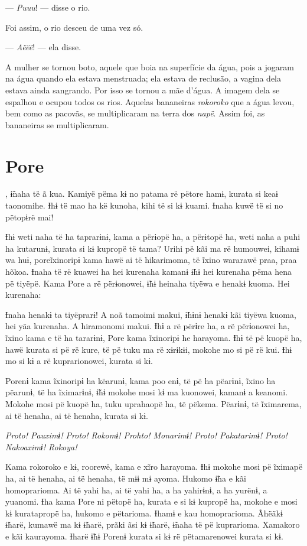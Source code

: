 --- \textit{Puuu}! --- disse o rio. 

Foi assim, o rio desceu de uma vez só. 

--- \textit{Aëëë}! --- ela disse. 

A mulher se tornou boto, aquele que boia na superfície da água, pois a
jogaram na água quando ela estava menstruada; ela estava de reclusão, a
vagina dela estava ainda sangrando. Por isso se tornou a mãe d'água. 
A imagem dela se espalhou e ocupou todos os rios. Aquelas
bananeiras \textit{rokoroko} que a água levou, bem como as pacovãs, se
multiplicaram na terra dos \textit{napë}. Assim foi, as bananeiras se
multiplicaram. 

\chapter{Pore}
 
, ɨ̃naha të ã kua. Kamiyë pëma kɨ no patama rë pëtore hamɨ, kurata si
keaɨ taonomihe. Ɨhɨ të mao ha kë kunoha, kihi të si kɨ kuami. Ɨnaha kuwë
të si no pëtopɨrë mai! 

Ɨhɨ weti naha të ha taprarɨnɨ, kama a përɨopë ha, a përɨtopë ha, weti
naha a puhi ha kutarunɨ, kurata si kɨ kupropë të tama? Urihi pë kãi ma
rë humouwei, kihamɨ wa huɨ, poreĩxinoripɨ kama hawë ai të hikarimoma, të
ĩxino wararawë praa, praa hõkoa. Ɨnaha të rë kuawei ha hei kurenaha
kamanɨ ɨ̃hɨ hei kurenaha pëma hena pë tiyëpë. Kama Pore a rë përɨonowei,
ɨ̃hɨ heinaha tiyëwa e henakɨ kuoma. Hei kurenaha:

Ɨnaha henakɨ ta tiyëprarɨ! A noã tamoimi makui, ɨ̃hɨnɨ henakɨ kãi tiyëwa
kuoma, hei yãa kurenaha. A hiramonomi makui. Ɨhɨ a rë përɨre ha, a rë
përɨonowei ha, ĩxino kama e të ha tararɨnɨ, Pore kama ĩxinoripɨ he
harayoma. Ɨhɨ të pë kuopë ha, hawë kurata si pë rë kure, të pë tuku ma
rë xɨrɨkɨi, mokohe mo si pë rë kui. Ɨhɨ mo si kɨ a rë kuprarionowei,
kurata si kɨ. 

Porenɨ kama ĩxinoripɨ ha këarunɨ, kama poo enɨ, të pë ha pëarɨnɨ, ĩxino
ha pëarunɨ, të ha ĩximarɨnɨ, ɨ̃hɨ mokohe mosi kɨ ma kuonowei, kamanɨ a
keanomi. Mokohe mosi pë kuopë ha, tuku uprahaopë ha, të pëkema. Pëarɨnɨ,
të ĩximarema, ai të henaha, ai të henaha, kurata si kɨ.

\textit{Proto! Pauximɨ! Proto! Rokomɨ! Prohto! Monarimɨ! Proto! Pakatarimɨ!
Proto! Nakoaximɨ! Rokoya!} 

Kama rokoroko e kɨ, roorewë, kama e xĩro
harayoma. Ɨhɨ mokohe mosi pë ĩximapë ha, ai të henaha, ai të henaha, të
mɨɨ mɨ ayoma. Hukomo ɨ̃ha e kãi homoprarioma. Ai të yahi ha, ai të yahi
ha, a ha yahirɨnɨ, a ha yurënɨ, a yuanomi. Ɨha kama Pore ni pëtopë ha,
kurata e si kɨ kupropë ha, mokohe e mosi kɨ kuratapropë ha, hukomo e
pëtarioma. Ɨhamɨ e kau homoprarioma. Ãhëãkɨ ɨ̃harë, kumawë ma kɨ ɨ̃harë,
prãki ãsi kɨ ɨ̃harë, ɨ̃naha të pë kuprarioma. Xamakoro e kãi kaurayoma.
Ɨharë ɨ̃hɨ Porenɨ kurata si kɨ rë pëtamarenowei kurata si kɨ. 

